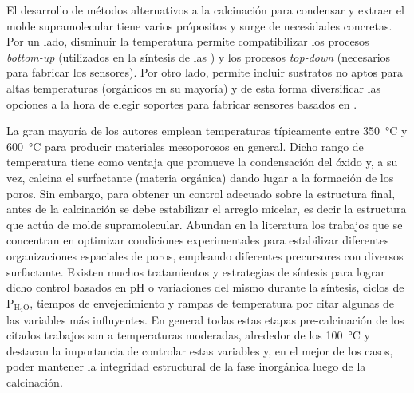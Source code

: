 	El desarrollo de métodos alternativos a la calcinación para condensar y extraer el molde supramolecular tiene varios própositos y surge de necesidades concretas. Por un lado, disminuir la temperatura permite compatibilizar los procesos \textit{bottom-up} (utilizados en la síntesis de las \pdm) y los procesos \textit{top-down} (necesarios para fabricar los sensores). Por otro lado, permite incluir sustratos no aptos para altas temperaturas (orgánicos en su mayoría) y de esta forma diversificar las opciones a la hora de elegir soportes para fabricar sensores basados en \pdm.\cite{Doshi2000a,Wagner2013,Innocenzi2013,Soler-Illia2002a,Zhang2005}

	La gran mayoría de los autores emplean temperaturas típicamente entre \SI{350}{\celsius} y \SI{600}{\celsius} para producir materiales mesoporosos en general.\cite{Kresge1992,Beck1992,DiRenzo1997}  Dicho rango de temperatura tiene como ventaja que promueve la condensación del óxido y, a su vez, calcina el surfactante (materia orgánica) dando lugar a la formación de los poros. Sin embargo, para obtener un control adecuado sobre la estructura final, antes de la calcinación se debe estabilizar el arreglo micelar, es decir la estructura que actúa de molde supramolecular. Abundan en la literatura los trabajos que se concentran en optimizar condiciones experimentales para estabilizar diferentes organizaciones espaciales de poros, empleando diferentes precursores con diversos surfactante\cite{Huo1996,Herregods2013,Grosso2001}. Existen muchos tratamientos y estrategias de síntesis para lograr dicho control basados en pH o variaciones del mismo durante la síntesis\cite{Doshi2000a,Soler-Illia2011,Boissiere2000,Huo1996,GonzalezSolveyra2017,Ichinose2002}, ciclos de P$_\text{H$_2$O}$\cite{Cagnol2002,Soler-Illia2012}, tiempos de envejecimiento\cite{Malfatti2009,Grosso2001} y rampas de temperatura\cite{Huang2002,Andrini2016,Soler-Illia2006,Rohlfing2005} por citar algunas de las variables más influyentes. En general todas estas etapas pre-calcinación de los citados trabajos son a temperaturas moderadas, alrededor de los \SI{100}{\celsius} y destacan la importancia de controlar estas variables y, en el mejor de los casos, poder mantener la integridad estructural de la fase inorgánica luego de la calcinación. 

